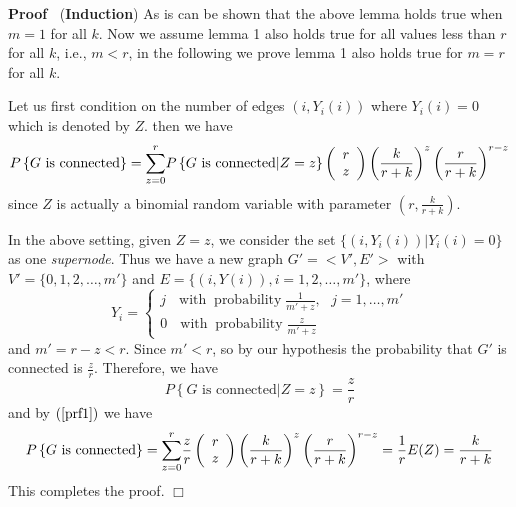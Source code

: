 \documentclass{IEEEconf}
\newcommand{\tmop}[1]{\ensuremath{\operatorname{#1}}}
\newcommand{\tmtextbf}[1]{{\bfseries{#1}}}
\newcommand{\tmtextit}[1]{{\itshape{#1}}}
\newenvironment{proof}{\noindent\textbf{Proof\ }}{\hspace*{\fill}$\Box$\medskip}
\begin{document}
\begin{proof}
  (\tmtextbf{Induction}) As is can be shown that the above lemma holds true
  when $m = 1$ for all $k$. Now we assume lemma 1 also holds true for all
  values less than $r$ for all $k$, i.e., $m < r$, in the following we prove
  lemma 1 also holds true for $m = r$ for all $k$.
  
  Let us first condition on the number of edges $(i, Y_i (i))$ where $Y_i (i)
  = 0$ which is denoted by $Z$. then we have
  \begin{equation}
    P \left\{ G \text{ is connected} \right\} = {%
    \overset{r}{\underset{z = 0}{\sum}}} P \left\{ G \text{ is connected} |Z =
    z \right\} \left( \begin{array}{c}
      r\\
      z
    \end{array} \right) \left( \frac{k}{r + k} \right)^z \left( \frac{r}{r +
    k} \right)^{r - z} \label{prf1}
  \end{equation}
  since $Z$ is actually a binomial random variable with parameter $\left( r,
  \frac{k}{r + k} \right)$.
  
  In the above setting, given $Z = z$, we consider the set $\{ (i, Y_i (i))
  |Y_i (i) = 0 \}$ as one \tmtextit{supernode}. Thus we have a new graph $G' =
  < V', E' >$ with $V' = \{ 0, 1, 2, \ldots, m' \}$ and $E = \{ (i, Y (i)), i
  = 1, 2, \ldots, m' \}$, where
  \[ Y_i = \left\{ \begin{array}{l}
       j \text{ \ \ \ } \tmop{with} \tmop{probability} \frac{1}{m' + z},
       \text{ } j = 1, \ldots, m'\\
       0 \text{ \ \ \ } \tmop{with} \tmop{probability} \frac{z}{m' + z}
     \end{array} \right. \]
  and $m' = r - z < r$. Since $m' < r$, so by our hypothesis the probability
  that $G'$ is connected is $\frac{z}{r}$. Therefore, we have
  \[ P \left\{ G \text{ is connected} |Z = z \right\} = \frac{z}{r} \]
  and by $\left( \ref{prf1} \right)$ we have
  \[ P \left\{ G \text{ is connected} \right\} = {%
     \overset{r}{\underset{z = 0}{\sum}}} \frac{z}{r} \left( \begin{array}{c}
       r\\
       z
     \end{array} \right) \left( \frac{k}{r + k} \right)^z \left( \frac{r}{r +
     k} \right)^{r - z} = \frac{1}{r} E (Z) = \frac{k}{r + k} \]
  This completes the proof.
\end{proof}
\end{document}
